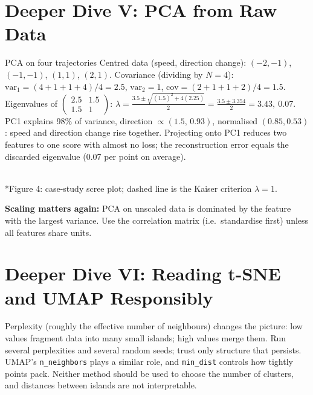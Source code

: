 \documentclass[11pt]{article}
\begin{document}
\section{Deeper Dive V: PCA from Raw Data}
\begin{example}{PCA on four trajectories}
Centred data (speed, direction change): $(-2,-1)$, $(-1,-1)$, $(1,1)$, $(2,1)$. Covariance (dividing by $N=4$): $\text{var}_1=(4+1+1+4)/4=2.5$, $\text{var}_2=1$, $\text{cov}=(2+1+1+2)/4=1.5$. Eigenvalues of $\begin{pmatrix}2.5&1.5\\1.5&1\end{pmatrix}$: $\lambda=\frac{3.5\pm\sqrt{(1.5)^2+4(2.25)}}{2}=\frac{3.5\pm3.354}{2}=3.43,\ 0.07$. PC1 explains 98\% of variance, direction $\propto(1.5,\,0.93)$, normalised $(0.85,0.53)$: speed and direction change rise together. Projecting onto PC1 reduces two features to one score with almost no loss; the reconstruction error equals the discarded eigenvalue (0.07 per point on average).
\end{example}
\begin{center}\\*{\small\color{GreyN}Figure 4: case-study scree plot; dashed line is the Kaiser criterion $\lambda=1$.}\end{center}
\textbf{Scaling matters again:} PCA on unscaled data is dominated by the feature with the largest variance. Use the correlation matrix (i.e.\ standardise first) unless all features share units.

\section{Deeper Dive VI: Reading t-SNE and UMAP Responsibly}
Perplexity (roughly the effective number of neighbours) changes the picture: low values fragment data into many small islands; high values merge them. Run several perplexities and several random seeds; trust only structure that persists. UMAP's \texttt{n\_neighbors} plays a similar role, and \texttt{min\_dist} controls how tightly points pack. Neither method should be used to choose the number of clusters, and distances between islands are not interpretable.
\end{document}

